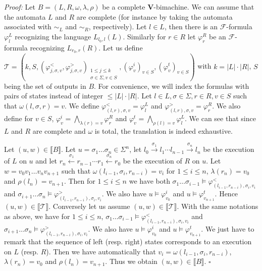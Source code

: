 \documentclass[12pt]{report}
\theoremstyle{definition}
\theoremstyle{remark}
\newenvironment{prf}
{\textit{Proof:}}
{\hfill $\square$\\}
\begin{document}
\begin{prf}
Let $B=(L,R,\omega,\lambda,\rho)$ be a complete \textbf V-bimachine.
We can assume that the automata $L$ and $R$ are complete (for instance by taking the automata associated with $\sim_L$ and $\sim_R$, respectively).
Let $l\in L$, then there is an $\mathcal F$-formula $\varphi_l^L$ recognizing the language $L_{l_0,l}(L)$. Similarly for $r\in R$ let $\varphi_r^R$ be an $\mathcal F$-formula recognizing $L_{r_0,r}(R)$.
Let us define $\mathcal T=\left(k,S,\left(\varphi_{j,\sigma,v}^<,\varphi_{j,\sigma,v}^>\right)_{\begin{smallmatrix} 1\leq j\leq k\\ \sigma \in \Sigma, v\in S \end{smallmatrix}},\left(\varphi_v^i\right)_{v\in S},\left(\varphi_v^t\right)_{v\in S}\right)$ with $k=|L|\cdot|R|$, $S$ being the set of outputs in $B$.
For convenience, we will index the formulas with pairs of states instead of integer $\leq |L|\cdot|R|$.
Let $l\in L,\sigma\in \Sigma, r\in R,v\in S$ such that $\omega(l,\sigma,r)=v$.
We define $\varphi_{(l,r),\sigma,v}^<=\varphi_l^L$ and $\varphi_{(l,r),\sigma,v}^>=\varphi_r^R$.
We also define for $v\in S$, $\varphi_v^i=\bigwedge_{\lambda(r)=v}\varphi_r^R$ and $\varphi_v^t=\bigwedge_{\rho(l)=v}\varphi_l^L$.
We can see that since $L$ and $R$ are complete and $\omega$ is total, the translation is indeed exhaustive.

Let $(u,w)\in\llbracket B \rrbracket$.
Let $u=\sigma_1\ldots\sigma_n \in \Sigma^n$, let $l_0\xrightarrow{\sigma_1}l_1\cdots l_{n-1}\xrightarrow{\sigma_n} l_n$ be the execution of $L$ on $u$ and let $r_n\xleftarrow{\sigma_1}r_{n-1}\cdots r_1\xleftarrow{\sigma_n} r_0$ be the execution of $R$ on $u$.
Let $w=v_0v_1\ldots v_nv_{n+1}$ such that $\omega(l_{i-1},\sigma_i,r_{n-i})=v_i$ for $1\leq i\leq n$, $\lambda(r_n)=v_0$ and $\rho(l_n)=v_{n+1}$.
Then for $1\leq i\leq n$ we have both $\sigma_1\ldots\sigma_{i-1}\models \varphi_{(l_{i-1},r_{n-i}),\sigma_i,v_i}^<$ and $\sigma_{i+1}\ldots\sigma_n\models \varphi_{(l_{i-1},r_{n-i}),\sigma_i,v_i}^>$. We also have $u\models \varphi_{v_0}^i$ and $u\models \varphi_{v_{n+1}}^t$.
Hence $(u,w)\in\llbracket \mathcal T \rrbracket$.
Conversely let us assume $(u,w)\in\llbracket \mathcal T \rrbracket$.
With the same notations as above, we have for $1\leq i\leq n$, $\sigma_1\ldots\sigma_{i-1}\models \varphi_{(l_{i-1},r_{n-i}),\sigma_i,v_i}^<$ and $\sigma_{i+1}\ldots\sigma_n\models \varphi_{(l_{i-1},r_{n-i}),\sigma_i,v_i}^>$. We also have $u\models \varphi_{v_0}^i$ and $u\models \varphi_{v_{n+1}}^t$.
We just have to remark that the sequence of left (resp. right) states corresponds to an execution on $L$ (resp. $R$).
Then we have automatically that $v_i=\omega(l_{i-1},\sigma_i,r_{n-i})$, $\lambda(r_n)=v_0$ and $\rho(l_n)=v_{n+1}$. Thus we obtain $(u,w)\in\llbracket B \rrbracket$.
\end{prf}
\end{document}

